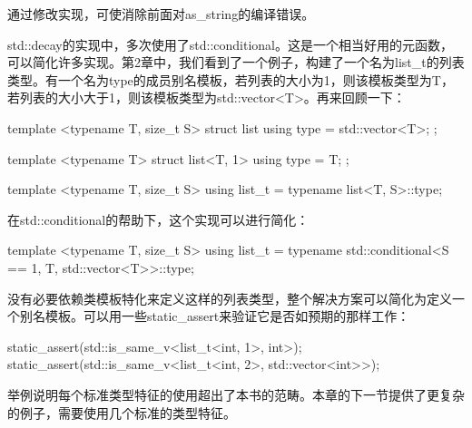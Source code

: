 通过修改实现，可使消除前面对as\_string的编译错误。

std::decay的实现中，多次使用了std::conditional。这是一个相当好用的元函数，可以简化许多实现。第2章中，我们看到了一个例子，构建了一个名为list\_t的列表类型。有一个名为type的成员别名模板，若列表的大小为1，则该模板类型为T，若列表的大小大于1，则该模板类型为std::vector<T>。再来回顾一下：

\begin{cpp}
template <typename T, size_t S>
struct list
{
	using type = std::vector<T>;
};

template <typename T>
struct list<T, 1>
{
	using type = T;
};

template <typename T, size_t S>
using list_t = typename list<T, S>::type;
\end{cpp}

在std::conditional的帮助下，这个实现可以进行简化：

\begin{cpp}
template <typename T, size_t S>
using list_t =
	typename std::conditional<S ==
					1, T, std::vector<T>>::type;
\end{cpp}

没有必要依赖类模板特化来定义这样的列表类型，整个解决方案可以简化为定义一个别名模板。可以用一些static\_assert来验证它是否如预期的那样工作：

\begin{cpp}
static_assert(std::is_same_v<list_t<int, 1>, int>);
static_assert(std::is_same_v<list_t<int, 2>,
							std::vector<int>>);
\end{cpp}

举例说明每个标准类型特征的使用超出了本书的范畴。本章的下一节提供了更复杂的例子，需要使用几个标准的类型特征。



























